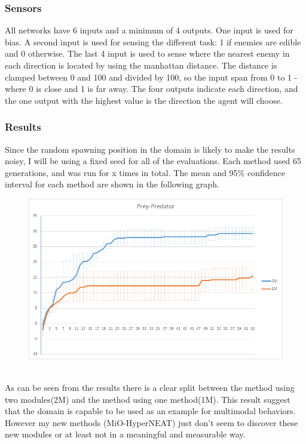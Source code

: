 \documentclass[11pt, a4paper]{article}
\begin{document}
\subsubsection{Sensors}
All networks have 6 inputs and a minimum of 4 outputs. One input is used for bias. A second input is used for sensing the different task: 1 if enemies are edible and 0 otherwise. The last 4 input is used to sense where the nearest enemy in each direction is located by using the manhattan distance. The distance is clamped between 0 and 100 and divided by 100, so the input span from 0 to 1 - where 0 is close and 1 is far away. The four outputs indicate each direction, and the one output with the highest value is the direction the agent will choose.
\subsubsection{Results}
Since the random spawning position in the domain is likely to make the results noisy, I will be using a fixed seed for all of the evaluations. Each method used 65 generations, and was run for x times in total. The mean and 95\% confidence interval for each method are shown in the following graph.
\begin{figure}[!ht]
\centering
\includegraphics[scale=0.5]{Results/PreyPredatorResults}
\caption{}
\end{figure}
\\
As can be seen from the results there is a clear split between the method using two modules(2M) and the method using one method(1M). This result suggest that the domain is capable to be used as an example for multimodal behaviors. However my new methods (MiO-HyperNEAT) just don't seem to discover these new modules or at least not in a meaningful and measurable way.
\end{document}

